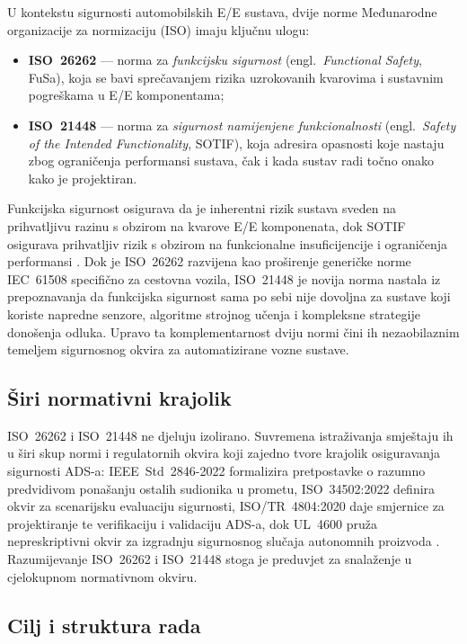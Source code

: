U kontekstu sigurnosti automobilskih E/E sustava, dvije norme Međunarodne organizacije za normizaciju (ISO) imaju ključnu ulogu:
\begin{itemize}
  \item \textbf{ISO~26262} \cite{iso26262} — norma za \textit{funkcijsku sigurnost} (engl.\ \textit{Functional Safety}, FuSa), koja se bavi sprečavanjem rizika uzrokovanih kvarovima i sustavnim pogreškama u E/E komponentama;
  \item \textbf{ISO~21448} \cite{iso21448} — norma za \textit{sigurnost namijenjene funkcionalnosti} (engl.\ \textit{Safety of the Intended Functionality}, SOTIF), koja adresira opasnosti koje nastaju zbog ograničenja performansi sustava, čak i kada sustav radi točno onako kako je projektiran.
\end{itemize}

Funkcijska sigurnost osigurava da je inherentni rizik sustava sveden na prihvatljivu razinu s obzirom na kvarove E/E komponenata, dok SOTIF osigurava prihvatljiv rizik s obzirom na funkcionalne insuficijencije i ograničenja performansi \cite{patel2025sotifslr}. Dok je ISO~26262 razvijena kao proširenje generičke norme IEC~61508 specifično za cestovna vozila, ISO~21448 je novija norma nastala iz prepoznavanja da funkcijska sigurnost sama po sebi nije dovoljna za sustave koji koriste napredne senzore, algoritme strojnog učenja i kompleksne strategije donošenja odluka. Upravo ta komplementarnost dviju normi čini ih nezaobilaznim temeljem sigurnosnog okvira za automatizirane vozne sustave.

\subsection{Širi normativni krajolik}

ISO~26262 i ISO~21448 ne djeluju izolirano. Suvremena istraživanja smještaju ih u širi skup normi i regulatornih okvira koji zajedno tvore krajolik osiguravanja sigurnosti ADS-a: IEEE~Std~2846-2022 formalizira pretpostavke o razumno predvidivom ponašanju ostalih sudionika u prometu, ISO~34502:2022 definira okvir za scenarijsku evaluaciju sigurnosti, ISO/TR~4804:2020 daje smjernice za projektiranje te verifikaciju i validaciju ADS-a, dok UL~4600 pruža nepreskriptivni okvir za izgradnju sigurnosnog slučaja autonomnih proizvoda \cite{shinde2026reimagining}. Razumijevanje ISO~26262 i ISO~21448 stoga je preduvjet za snalaženje u cjelokupnom normativnom okviru.

\subsection{Cilj i struktura rada}

